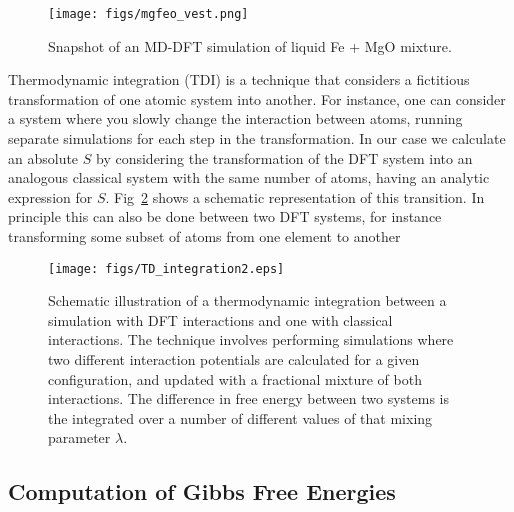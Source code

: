  \begin{figure}[h!] %
   \centering
   \texttt{[image: figs/mgfeo\_vest.png]} 
\caption{Snapshot of an MD-DFT simulation of liquid Fe + MgO
    mixture.\label{femgosnap}}
\end{figure}

Thermodynamic integration (TDI) is a technique that considers a fictitious
transformation of one atomic system into another. For instance, one can consider a
system where you slowly change the interaction between atoms, running separate
simulations for each step in the transformation. In our case we calculate an absolute
$S$ by considering the transformation of the DFT system into an
analogous classical system with the same number of atoms, having an analytic
expression for $S$. Fig~\ref{tdi} shows a schematic representation of this
transition. In principle this can also be done between two DFT systems, for
instance transforming some subset of atoms from one element to another 

 \begin{figure}[h!] %
   \centering
   \texttt{[image: figs/TD\_integration2.eps]} 
\caption{Schematic illustration of a thermodynamic integration between a simulation 
    with DFT interactions and one with classical interactions. The technique involves
    performing simulations where two different interaction potentials are calculated
    for a given configuration, and updated with a fractional mixture of both
    interactions. The difference in free energy between two systems is the integrated 
    over a number of different values of that mixing parameter $\lambda$.\label{tdi}}
\end{figure}

\subsection{Computation of Gibbs Free Energies}


